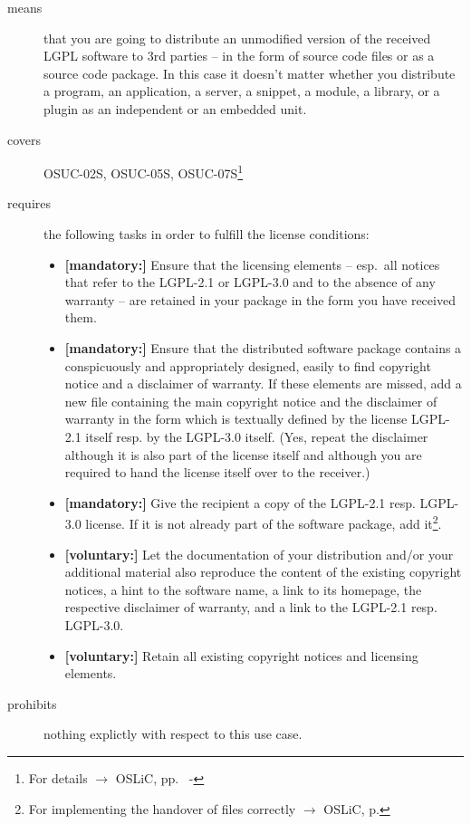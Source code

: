 \begin{description}

\item[means] that you are going to distribute an unmodified version of the
received LGPL software to 3rd parties -- in the form of source code files or as
a source code package. In this case it doesn't matter whether you distribute a
program, an application, a server, a snippet, a module, a library, or a plugin
as an independent or an embedded unit.

\item[covers] OSUC-02S, OSUC-05S, OSUC-07S\footnote{For details $\rightarrow$
OSLiC, pp.\ \pageref{OSUC-02S-DEF} - \pageref{OSUC-07S-DEF}}

\item[requires] the following tasks in order to fulfill the license conditions:
\begin{itemize}
 
  \item \textbf{[mandatory:]} Ensure that the licensing elements -- esp.\ all
  notices that refer to the LGPL-2.1 or LGPL-3.0 and to the absence of any
  warranty -- are retained in your package in the form you have received them.

  \item \textbf{[mandatory:]} Ensure that the distributed software package
  contains a conspicuously and appropriately designed, easily to find copyright
  notice and a disclaimer of warranty. If these elements are missed, add a new
  file containing the main copyright notice and the disclaimer of warranty in the
  form which is textually defined by the license LGPL-2.1 itself resp. by the
  LGPL-3.0 itself. (Yes, repeat the disclaimer although it is also part of the
  license itself and although you are required to hand the license itself over
  to the receiver.)
  
  \item \textbf{[mandatory:]} Give the recipient a copy of the LGPL-2.1 resp.
  LGPL-3.0 license. If it is not already part of the software package, add
  it\footnote{For implementing the handover of files correctly $\rightarrow$
  OSLiC, p. \pageref{DistributingFilesHint}}.
  
  \item \textbf{[voluntary:]} Let the documentation of your distribution and/or
  your additional material also reproduce the content of the existing
  copyright notices, a hint to the software name, a link to its homepage,
  the respective disclaimer of warranty, and a link to the LGPL-2.1 resp.
  LGPL-3.0.
  
  \item \textbf{[voluntary:]} Retain all existing copyright notices and
  licensing elements.
  
\end{itemize}

\item[prohibits] nothing explictly with respect to this use case.

\end{description}


